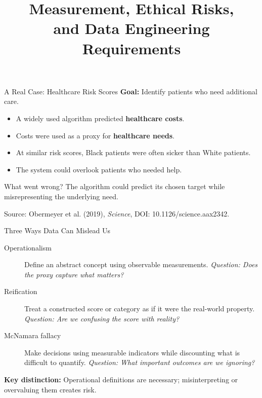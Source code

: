 \documentclass[aspectratio=43,10pt]{beamer}
\title{Measurement, Ethical Risks,\\and Data Engineering Requirements}
\author{}
\date{
\color{aggiemaroon}{
DAEN 459 - Fall 2026\\
\textbf{Alexander Abuabara}
}}
\begin{document}
\begin{frame}
\titlepage
\end{frame}

\begin{frame}{A Real Case: Healthcare Risk Scores}
\textbf{Goal:} Identify patients who need additional care.

\medskip
\begin{itemize}
  \item A widely used algorithm predicted \textbf{healthcare costs}.
  \item Costs were used as a proxy for \textbf{healthcare needs}.
  \item At similar risk scores, Black patients were often sicker
        than White patients.
  \item The system could overlook patients who needed help.
\end{itemize}

\medskip
\begin{block}{What went wrong?}
The algorithm could predict its chosen target while
misrepresenting the underlying need.
\end{block}

{\footnotesize Source: Obermeyer et al. (2019), \emph{Science},
DOI: 10.1126/science.aax2342.}
\end{frame}

\begin{frame}{Three Ways Data Can Mislead Us}
\begin{description}
\item[Operationalism] Define an abstract concept using
observable measurements.\newline
\emph{Question: Does the proxy capture what matters?}

\medskip
\item[Reification] Treat a constructed score or category
as if it were the real-world property.\newline
\emph{Question: Are we confusing the score with reality?}

\medskip
\item[McNamara fallacy] Make decisions using measurable
indicators while discounting what is difficult to quantify.\newline
\emph{Question: What important outcomes are we ignoring?}
\end{description}

\medskip
\textbf{Key distinction:} Operational definitions are necessary;
misinterpreting or overvaluing them creates risk.
\end{frame}
\end{document}
